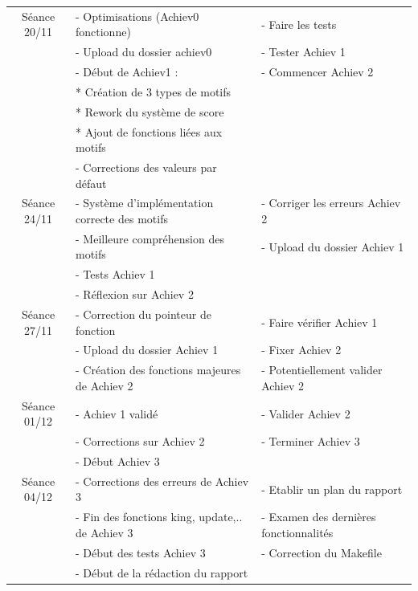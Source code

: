 \documentclass[a4paper]{article}
\begin{document}
\begin{tabular}{|c|l|l|}
     Séance 20/11
     & - Optimisations (Achiev0 fonctionne) & - Faire les tests \\
     & - Upload du dossier achiev0 & - Tester Achiev 1 \\
     & - Début de Achiev1 : & - Commencer Achiev 2 \\
     & * Création de 3 types de motifs &  \\ 
     & * Rework du système de score &   \\
     & * Ajout de fonctions liées aux motifs & \\
     & -  Corrections des valeurs par défaut & \tabularnewline

     \hline
     Séance 24/11
     & - Système d'implémentation correcte des motifs & - Corriger les erreurs Achiev 2\\
     & - Meilleure compréhension des motifs & - Upload du dossier Achiev 1 \\
     & - Tests Achiev 1 & \\
     & - Réflexion sur Achiev 2 & \tabularnewline
     \hline
     
    Séance 27/11
     & - Correction du pointeur de fonction & - Faire vérifier Achiev 1 \\
     & - Upload du dossier Achiev 1 & - Fixer Achiev 2\\
     & - Création des fonctions majeures de Achiev 2 & - Potentiellement valider Achiev 2 \tabularnewline
     \hline
     
     Séance 01/12 
     & - Achiev 1 validé & - Valider Achiev 2 \\
     & - Corrections sur Achiev 2 & - Terminer Achiev 3 \\
     & - Début Achiev 3 & \tabularnewline
     \hline
     
     Séance 04/12 
     & - Corrections des erreurs de Achiev 3 & - Etablir un plan du rapport \\
     & - Fin des fonctions king, update,.. de Achiev 3 & - Examen des dernières fonctionnalités \\
     & - Début des tests Achiev 3 & - Correction du Makefile \\
     & - Début de la rédaction du rapport & \tabularnewline
     \hline
     

\end{tabular}
\end{document}
